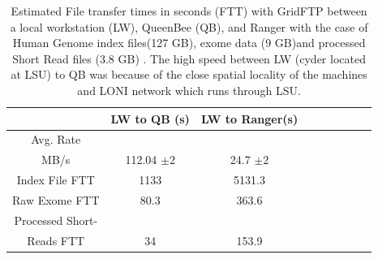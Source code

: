\documentclass[]{svjour3}
\begin{document}
 \begin{table}
\centering
 \small
 \begin{tabular}{|c|c|c|c|c|c|c|c|c|} 
 \hline  
 	          & LW to QB (s)  & LW to Ranger(s) \\
 \hline                       
Avg. Rate && \\
MB/s & 112.04 $\pm 2$ &	    24.7 $\pm 2$  \\
 \hline                       
Index File	FTT & 1133  &	    5131.3      \\        
 \hline                       
Raw 	 Exome FTT&80.3 & 363.6\\                  
 \hline                       
Processed Short-&    & \\
Reads FTT&34&153.9  \\
 \hline                       
                    
\end{tabular}


\caption{Estimated File transfer times in seconds (FTT) with GridFTP between a local workstation (LW), QueenBee (QB), and Ranger with the case of Human Genome index files(127 GB), exome data (9 GB)and processed Short Read files (3.8 GB) . The high speed between LW (cyder located at LSU) to QB was because of the close spatial locality of the machines and LONI network which runs through LSU.  }

 \label{table:NGS-Distributed-file} 
\end{table}
\end{document}
